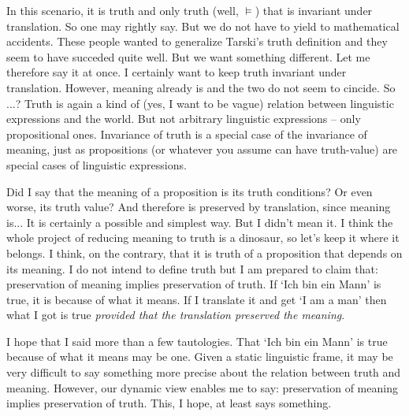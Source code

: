 \documentclass[10pt]{article}
\newcommand{\<}{\langle}
\renewcommand{\>}{\rangle}
\newcommand{\wo}[1]{`#1'}
\begin{document}
In this scenario, it is truth and only truth (well, $\models$) that is 
invariant under translation. So one may rightly say. But we do not have to 
yield to mathematical accidents. These people wanted to generalize Tarski's 
truth definition and they seem to have succeded quite well. But we want 
something different. Let me therefore say it at once. I certainly want to 
keep truth invariant under translation. However, meaning already is and 
the two do not seem to cincide. So ...? Truth is again a kind of (yes, I 
want to be vague) relation between linguistic expressions and the world. But 
not arbitrary linguistic expressions -- only propositional ones. Invariance 
of truth is a special case of the invariance of meaning, just as 
propositions (or whatever you assume can have truth-value) are special 
cases of linguistic expressions. 

Did I say that the meaning of a proposition is its truth conditions? Or even 
worse, its truth value? And therefore is preserved by translation, since 
meaning is... It is certainly a possible and simplest way. But I didn't mean 
it. I think the whole project of reducing meaning to truth is a dinosaur, 
so let's keep it where it belongs. I think, on the contrary, that it is 
truth of a proposition that depends on its meaning. I do not intend to 
define truth but I am prepared to claim that: preservation of 
meaning implies preservation of truth. If \wo{Ich bin ein Mann} is true, it 
is because of what it means. If I translate it and get \wo{I am a man} 
then what I got is true {\em provided that the translation preserved the 
meaning}. 

I hope that I said more than a few tautologies. That \wo{Ich bin ein Mann} 
is true because of what it means may be one. Given a static linguistic frame, 
it may be very difficult to say something more precise about the relation 
between truth and meaning. However, our dynamic view enables me to say: 
preservation of meaning implies preservation of truth. This, I hope, at 
least says something.
\end{document}
